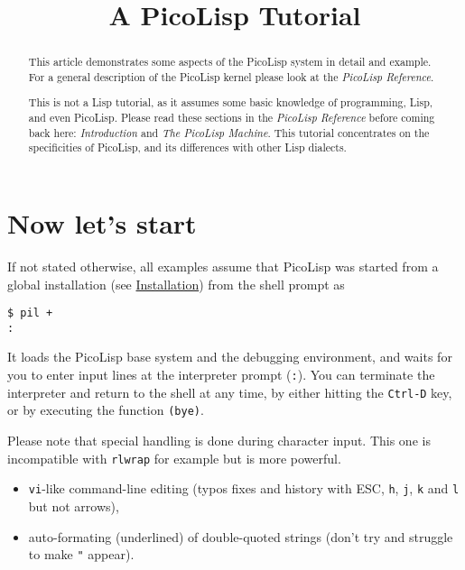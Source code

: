 \title{A PicoLisp Tutorial}

\maketitle


\begin{abstract}
  This article demonstrates some aspects of the PicoLisp system in
  detail and example. For a general description of the PicoLisp kernel
  please look at the \emph{PicoLisp Reference}.

  This is not a Lisp tutorial, as it assumes some basic knowledge of
  programming, Lisp, and even PicoLisp. Please read these sections in
  the \emph{PicoLisp Reference} before coming back here:
  \emph{Introduction} and \emph{The PicoLisp Machine}. This tutorial
  concentrates on the specificities of PicoLisp, and its differences
  with other Lisp dialects.
\end{abstract}

\section{Now let's start}
\label{sec:tut-now-lets-start}

If not stated otherwise, all examples assume that PicoLisp was started
from a global installation (see \href{ref.html\#inst}{Installation})
from the shell prompt as

\begin{verbatim}
$ pil +
:
\end{verbatim}

It loads the PicoLisp base system and the debugging environment, and
waits for you to enter input lines at the interpreter prompt
(\texttt{:}). You can terminate the interpreter and return to the shell
at any time, by either hitting the \texttt{Ctrl-D} key, or by executing
the function \texttt{(bye)}.

Please note that special handling is done during character input. This
one is incompatible with \texttt{rlwrap} for example but is more
powerful.

\begin{itemize}
\item
  \texttt{vi}-like command-line editing (typos fixes and history with
  ESC, \texttt{h}, \texttt{j}, \texttt{k} and \texttt{l} but not
  arrows),
\item
  auto-formating (underlined) of double-quoted strings (don't try and
  struggle to make \texttt{"} appear).
\end{itemize}

